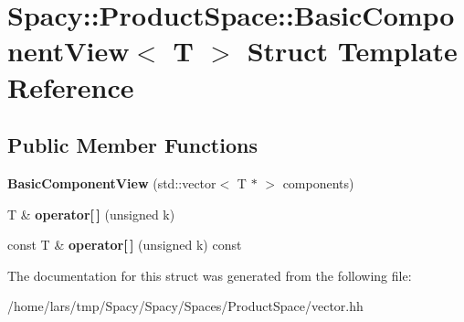 \hypertarget{structSpacy_1_1ProductSpace_1_1BasicComponentView}{}\section{Spacy\+:\+:Product\+Space\+:\+:Basic\+Component\+View$<$ T $>$ Struct Template Reference}
\label{structSpacy_1_1ProductSpace_1_1BasicComponentView}
\subsection*{Public Member Functions}
\begin{DoxyCompactItemize}
\item 
{\bfseries Basic\+Component\+View} (std\+::vector$<$ T $\ast$ $>$ components)\hypertarget{structSpacy_1_1ProductSpace_1_1BasicComponentView_a00b63d0532ba0c10157f655cb010d66f}{}\label{structSpacy_1_1ProductSpace_1_1BasicComponentView_a00b63d0532ba0c10157f655cb010d66f}

\item 
T \& {\bfseries operator\mbox{[}$\,$\mbox{]}} (unsigned k)\hypertarget{structSpacy_1_1ProductSpace_1_1BasicComponentView_a4c95c8eb67ae959ddb718076760d96c5}{}\label{structSpacy_1_1ProductSpace_1_1BasicComponentView_a4c95c8eb67ae959ddb718076760d96c5}

\item 
const T \& {\bfseries operator\mbox{[}$\,$\mbox{]}} (unsigned k) const \hypertarget{structSpacy_1_1ProductSpace_1_1BasicComponentView_ac5b900dd6b8e445581c2b51c0242c95c}{}\label{structSpacy_1_1ProductSpace_1_1BasicComponentView_ac5b900dd6b8e445581c2b51c0242c95c}

\end{DoxyCompactItemize}


The documentation for this struct was generated from the following file\+:\begin{DoxyCompactItemize}
\item 
/home/lars/tmp/\+Spacy/\+Spacy/\+Spaces/\+Product\+Space/vector.\+hh\end{DoxyCompactItemize}
